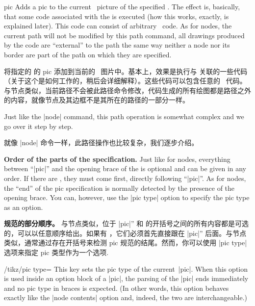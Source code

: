 \begin{pathoperation}{pic}{
}
    Adds a pic to the current \tikzname\ picture of the specified . The effect is, basically, that some code associated with the
     is executed (how this works, exactly, is explained later).
    This code can consist of arbitrary \tikzname\ code. As for nodes, the
    current path will not be modified by this path command, all drawings
    produced by the code are ``external'' to the path the same way neither a
    node nor its border are part of the path on which they are specified.

    将指定的  的 pic 添加到当前的 \tikzname\ 图片中。基本上，效果是执行与  关联的一些代码（关于这个是如何工作的，稍后会详细解释）。这些代码可以包含任意的 \tikzname\ 代码。与节点类似，当前路径不会被此路径命令修改，代码生成的所有绘图都是路径之外的内容，就像节点及其边框不是其所在的路径的一部分一样。

    Just like the |node| command, this path operation is somewhat complex and
    we go over it step by step.

    就像 |node| 命令一样，此路径操作也比较复杂，我们逐步介绍。

    \medskip
    \textbf{Order of the parts of the specification.}
    Just like for nodes, everything between ``|pic|'' and the opening brace of
    the  is optional and can be given in any order. If there are
    , they must come first, directly following
    ``|pic|''. As for nodes, the ``end'' of the pic specification is normally
    detected by the presence of the opening brace. You can, however, use the
    |pic type| option to specify the pic type as an option.

    \textbf{规范的部分顺序。}
与节点类似，位于 |pic|'' 和  的开括号之间的所有内容都是可选的，可以以任意顺序给出。如果有 ，它们必须首先直接跟在 |pic|'' 后面。与节点类似，通常通过存在开括号来检测 pic 规范的结尾。然而，你可以使用 |pic type| 选项来指定 pic 类型作为一个选项.

    \begin{key}{/tikz/pic type=}
        This key sets the pic type of the current~|pic|. When this option is
        used inside an option block of a |pic|, the parsing of the |pic| ends
        immediately and no pic type in braces is expected. (In other words,
        this option behaves exactly like the |node contents| option and,
        indeed, the two are interchangeable.)
        

\end{key}
\end{pathoperation}
